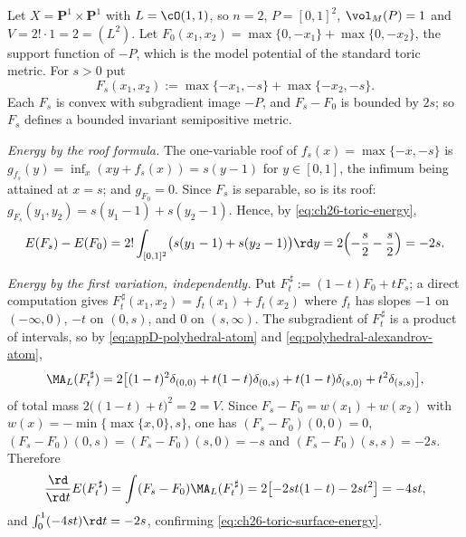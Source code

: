 \begin{example}
\label{ex:ch26-toric-surface}
Let $X=\mathbf P^1\times\mathbf P^1$ with $L=\cO(1,1)$, so $n=2$,
$P=[0,1]^2$, $\vol_M(P)=1$ and $V=2!\cdot1=2=(L^2)$.  Let
$F_0(x_1,x_2)=\max\{0,-x_1\}+\max\{0,-x_2\}$, the support function of
$-P$, which is the model potential of the standard toric metric.  For
$s>0$ put
\[
 F_s(x_1,x_2):=\max\{-x_1,-s\}+\max\{-x_2,-s\} .
\]
Each $F_s$ is convex with subgradient image $-P$, and $F_s-F_0$ is
bounded by $2s$; so $F_s$ defines a bounded invariant semipositive metric.

\emph{Energy by the roof formula.}  The one-variable roof of
$f_s(x)=\max\{-x,-s\}$ is
$g_{f_s}(y)=\inf_x(xy+f_s(x))=s(y-1)$ for $y\in[0,1]$, the infimum being
attained at $x=s$; and $g_{F_0}=0$.  Since $F_s$ is separable, so is
its roof: $g_{F_s}(y_1,y_2)=s(y_1-1)+s(y_2-1)$.  Hence, by
\eqref{eq:ch26-toric-energy},
\begin{equation}
\label{eq:ch26-toric-surface-energy}
 E(F_s)-E(F_0)
 =2!\int_{[0,1]^2}\bigl(s(y_1-1)+s(y_2-1)\bigr)\rd y
 =2\Bigl(-\frac s2-\frac s2\Bigr)=-2s .
\end{equation}

\emph{Energy by the first variation, independently.}  Put
$F_t^{\,\sharp}:=(1-t)F_0+tF_s$; a direct computation gives
$F_t^{\,\sharp}(x_1,x_2)=f_t(x_1)+f_t(x_2)$ where $f_t$ has slopes
$-1$ on $(-\infty,0)$, $-t$ on $(0,s)$, and $0$ on $(s,\infty)$.
The subgradient of $F_t^{\,\sharp}$ is a product of intervals, so by
\eqref{eq:appD-polyhedral-atom} and \eqref{eq:polyhedral-alexandrov-atom},
\[
 \MA_L(F_t^{\,\sharp})
 =2\bigl[(1-t)^2\delta_{(0,0)}+t(1-t)\delta_{(0,s)}
        +t(1-t)\delta_{(s,0)}+t^2\delta_{(s,s)}\bigr],
\]
of total mass $2\bigl((1-t)+t\bigr)^2=2=V$.  Since
$F_s-F_0=w(x_1)+w(x_2)$ with $w(x)=-\min\{\max\{x,0\},s\}$, one has
$(F_s-F_0)(0,0)=0$, $(F_s-F_0)(0,s)=(F_s-F_0)(s,0)=-s$ and
$(F_s-F_0)(s,s)=-2s$.  Therefore
\[
 \frac{\rd}{\rd t}E(F_t^{\,\sharp})
 =\int(F_s-F_0)\MA_L(F_t^{\,\sharp})
 =2\bigl[-2st(1-t)-2st^2\bigr]=-4st ,
\]
and $\int_0^1(-4st)\rd t=-2s$, confirming
\eqref{eq:ch26-toric-surface-energy}.


\end{example}
